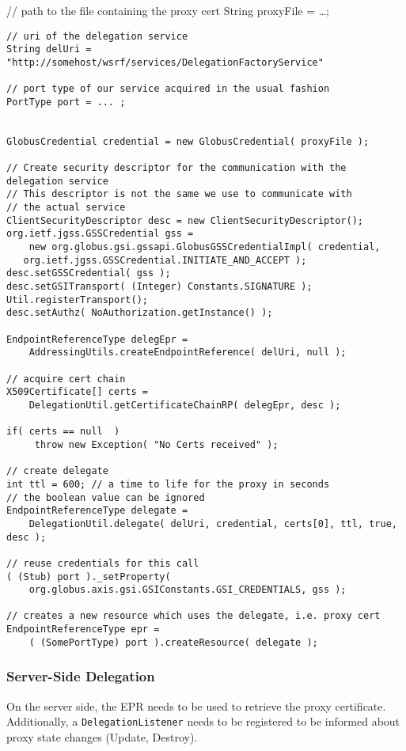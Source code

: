 \documentclass{article}
\begin{document}
// path to the file containing the proxy cert String proxyFile =
\ldots{};

\begin{verbatim}
// uri of the delegation service
String delUri =  "http://somehost/wsrf/services/DelegationFactoryService"

// port type of our service acquired in the usual fashion
PortType port = ... ;


GlobusCredential credential = new GlobusCredential( proxyFile );

// Create security descriptor for the communication with the delegation service
// This descriptor is not the same we use to communicate with
// the actual service
ClientSecurityDescriptor desc = new ClientSecurityDescriptor();
org.ietf.jgss.GSSCredential gss = 
    new org.globus.gsi.gssapi.GlobusGSSCredentialImpl( credential, 
   org.ietf.jgss.GSSCredential.INITIATE_AND_ACCEPT );
desc.setGSSCredential( gss );
desc.setGSITransport( (Integer) Constants.SIGNATURE );
Util.registerTransport();
desc.setAuthz( NoAuthorization.getInstance() );

EndpointReferenceType delegEpr = 
    AddressingUtils.createEndpointReference( delUri, null );

// acquire cert chain 
X509Certificate[] certs = 
    DelegationUtil.getCertificateChainRP( delegEpr, desc );

if( certs == null  )
     throw new Exception( "No Certs received" );

// create delegate
int ttl = 600; // a time to life for the proxy in seconds 
// the boolean value can be ignored
EndpointReferenceType delegate = 
    DelegationUtil.delegate( delUri, credential, certs[0], ttl, true, desc );

// reuse credentials for this call
( (Stub) port )._setProperty( 
    org.globus.axis.gsi.GSIConstants.GSI_CREDENTIALS, gss ); 

// creates a new resource which uses the delegate, i.e. proxy cert
EndpointReferenceType epr = 
    ( (SomePortType) port ).createResource( delegate );
\end{verbatim}

\subsubsection{Server-Side Delegation}

On the server side, the EPR needs to be used to retrieve the proxy
certificate. Additionally, a \verb!DelegationListener! needs to be
registered to be informed about proxy state changes (Update,
Destroy).
\end{document}

